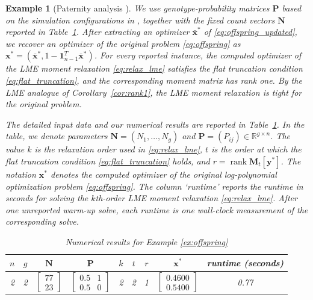 \documentclass[pdflatex,sn-mathphys-num]{sn-jnl}%
\newcommand{\re}{\mathbb{R}}
\DeclareMathOperator{\rank}{rank}
\newcommand{\rd}[1]{{\color{red}#1}}
\newcommand{\vect}[1]{\boldsymbol{#1}}
\newcommand{\mat}[1]{\boldsymbol{#1}}
\theoremstyle{thmstyleone}%
\theoremstyle{thmstyletwo}%
\newtheorem{example}{Example}%
\theoremstyle{thmstylethree}%
\begin{document}
\begin{example}[Paternity analysis \cite{McCulloch87}]
We use genotype-probability matrices $\mat{P}$ based on the
simulation configurations in \cite{McCulloch87}, together with the
fixed count vectors $\vect{N}$ reported in
Table~\ref{tab:offspring}.
	After extracting an optimizer $\vect{\bar{x}}^*$ of
	\eqref{eq:offspring_updated}, we recover an optimizer of the original
	problem \eqref{eq:offspring} as
	$\vect{x}^*=(\vect{\bar{x}}^*,
	1-\mathbf{1}_{n-1}^T\vect{\bar{x}}^*)$.
	For every reported instance, the computed optimizer of the LME
	moment relaxation \eqref{eq:relax_lme} satisfies the flat truncation
	condition \eqref{eq:flat_truncation}, and the corresponding moment
	matrix has rank one. By the LME analogue of
	Corollary~\ref{cor:rank1}, the LME moment relaxation is tight for the
	original problem.

	The detailed input data and our numerical results are reported 
	in Table~\ref{tab:offspring}.
	In the table, we denote parameters
	$\vect{N} = (N_1,\ldots, N_{g})$ 
	and $\mat{P} = (P_{ij})\in\re^{g\times n}$.
	The value $k$ is the relaxation order used in
	\eqref{eq:relax_lme}, $t$ is the order at which the flat truncation
	condition \eqref{eq:flat_truncation} holds, and
	$r=\rank\mat{M}_t[\vect{y}^*]$.
	The notation $\vect{x}^*$ denotes the computed optimizer of the original log-polynomial
	optimization problem \eqref{eq:offspring}.
	The column `runtime' reports the runtime in seconds for solving
	the $k$th-order LME moment relaxation \eqref{eq:relax_lme}.
	After one unreported warm-up solve, each runtime is one wall-clock
	measurement of the corresponding solve.
	\begin{table}[ht]
	\centering
	\caption{Numerical results for Example \ref{ex:offspring}}
    \label{tab:offspring}
	\setlength{\tabcolsep}{3pt}
	\begin{tabular}{|c|c|c|c|c|c|c|c|c|}\hline
		$n$ & $g$ & $\vect{N}$ & $\mat{P}$ & $k$ & $t$ & $r$ & $\vect{x}^*$ & runtime (seconds)\\ \hline
		2 & 2 &$\left[\begin{array}{r}
			77 \\ 23
		\end{array}\right]$ & $\begin{bmatrix}
			0.5 & 1 \\
			0.5 & 0
		\end{bmatrix}$ & 2 & \rd{2} & 1 & $\left[\begin{array}{r}
			0.4600 \\ 0.5400
		\end{array}\right]$ & 0.77\\ \hline

\end{tabular}
\end{table}
\end{example}
\end{document}
